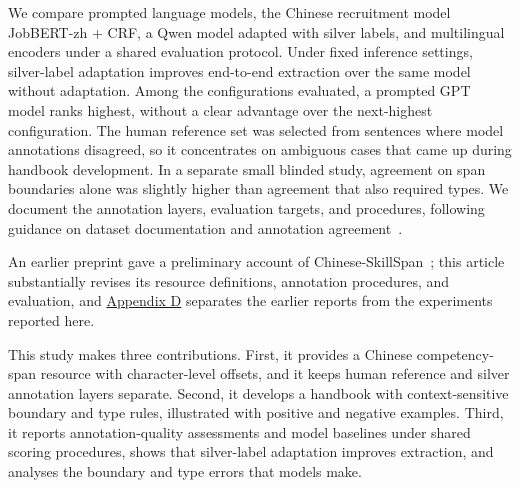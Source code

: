 We compare prompted language models, the Chinese recruitment model JobBERT-zh + CRF, a Qwen model adapted with silver labels, and multilingual encoders under a shared evaluation protocol. Under fixed inference settings, silver-label adaptation improves end-to-end extraction over the same model without adaptation. Among the configurations evaluated, a prompted GPT model ranks highest, without a clear advantage over the next-highest configuration. The human reference set was selected from sentences where model annotations disagreed, so it concentrates on ambiguous cases that came up during handbook development. In a separate small blinded study, agreement on span boundaries alone was slightly higher than agreement that also required types. We document the annotation layers, evaluation targets, and procedures, following guidance on dataset documentation and annotation agreement~\citep{bender2018datastatements,gebru2021datasheets,artstein2008agreement}.

An earlier preprint gave a preliminary account of Chinese-SkillSpan~\citep{li2026chineseskillspanpreprint}; this article substantially revises its resource definitions, annotation procedures, and evaluation, and \hyperref[app:d]{Appendix D} separates the earlier reports from the experiments reported here.

This study makes three contributions. First, it provides a Chinese competency-span resource with character-level offsets, and it keeps human reference and silver annotation layers separate. Second, it develops a handbook with context-sensitive boundary and type rules, illustrated with positive and negative examples. Third, it reports annotation-quality assessments and model baselines under shared scoring procedures, shows that silver-label adaptation improves extraction, and analyses the boundary and type errors that models make.
